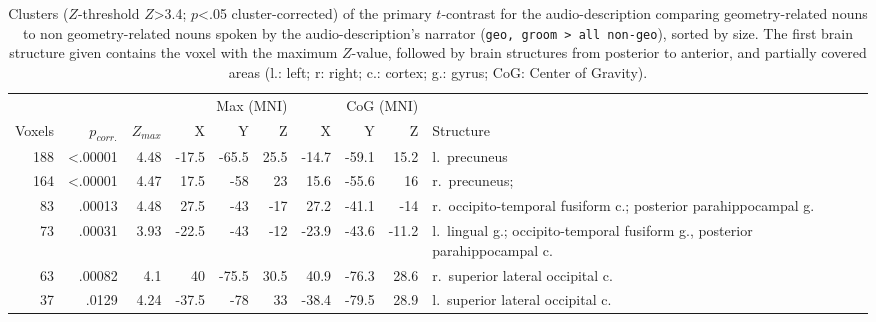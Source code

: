 \documentclass[english]{article}
\begin{document}
\begin{table*}[tbp]
\caption{Clusters ($Z$-threshold $Z$>3.4; $p$<.05 cluster-corrected)
    of the primary $t$-contrast for the audio-description comparing
    geometry-related nouns to non geometry-related nouns spoken by the
    audio-description's narrator (\texttt{geo, groom > all non-geo}), sorted by size.
    The first brain structure given contains the voxel with the maximum $Z$-value,
    followed by brain structures from posterior to anterior, and partially
    covered areas (l.: left; r: right; c.: cortex; g.: gyrus; CoG: Center of
    Gravity).}
    \label{tab:res-ao-group1}
\small
\begin{tabular}{rrrrrrrrrp{4.7cm}}
\toprule
& & & \multicolumn{3}{r}{Max (MNI)} & \multicolumn{3}{r}{CoG (MNI)} &
\\ \cmidrule{4-6} \cmidrule{7-9}
Voxels & $p_{corr.}$ & $Z_{max}$ & X & Y & Z  & X & Y & Z & Structure \\
\midrule
188 & <.00001 & 4.48 & -17.5 & -65.5 & 25.5 & -14.7 & -59.1 & 15.2 & l.~precuneus \\ %
164 & <.00001 & 4.47 & 17.5 & -58 & 23 & 15.6 & -55.6 & 16 & r.~precuneus;
\\ %
83 & .00013 & 4.48 & 27.5 & -43 & -17 & 27.2 & -41.1 & -14 & r.~occipito-temporal fusiform c.; posterior parahippocampal g. \\ %
73 & .00031 & 3.93 & -22.5 & -43 & -12 & -23.9 & -43.6 & -11.2 & l.~lingual
g.; occipito-temporal fusiform g., posterior parahippocampal c. \\ %
63 & .00082 & 4.1 & 40 & -75.5 & 30.5 & 40.9 & -76.3 & 28.6 & r.~superior
lateral occipital c. \\ %
37 & .0129 & 4.24 & -37.5 & -78 & 33 & -38.4 & -79.5 & 28.9 & l.~superior
lateral occipital c. \\ %
\bottomrule
\end{tabular}
\end{table*}


\end{document}
